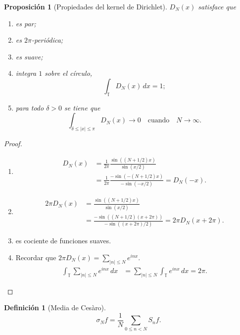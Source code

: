 \documentclass{article}
\newtheorem{Proposicion}{Proposición}
\theoremstyle{plain}
\theoremstyle{definition}
\newtheorem{Definicion}{Definición}
\newcommand{\T}{\mathbb{T}}
\newcommand{\abs}[1]{\lvert #1 \rvert}
\begin{document}
\begin{Proposicion}[Propiedades del kernel de Dirichlet]
  \(D_N(x)\) satisface que
  \begin{enumerate}
    \item es par;
    \item es \(2\pi\){-}periódica;
    \item es suave;
    \item integra \(1\) sobre el círculo,
    \begin{displaymath}
      \int_{\T} D_N(x) \, dx = 1;
    \end{displaymath}
    \item para todo \(\delta > 0\) se tiene que
    \begin{displaymath}
      \int_{\delta \le \abs{x} \le \pi} D_N(x) \to 0
      \quad \text{cuando}\quad N\to \infty.
    \end{displaymath}
  \end{enumerate}
\end{Proposicion}
\begin{proof}
\begin{enumerate}
  \item 
  \begin{align*}
    D_N(x) 
    &= \frac{1}{2\pi} \frac{\sin((N+1/2)x)}{\sin(x/2)} 
    \\&= \frac{1}{2\pi} \frac{-\sin(-(N+1/2)x)}{-\sin(-x/2)} 
    = D_N(-x).
  \end{align*}

  \item
  \begin{align*}
    2\pi D_N(x) 
    &= \frac{\sin((N+1/2)x)}{\sin(x/2)} 
    \\&= \frac{-\sin((N+1/2)(x+2\pi))}{-\sin((x+2\pi)/2)} 
    = 2\pi D_N(x+2\pi).
  \end{align*}

  \item es cociente de funciones suaves.

  \item Recordar que \(2\pi D_N(x) = \sum_{\abs{n}\le N} e^{inx}\). 
  \begin{align*}
    \int_{\T} \sum_{\abs{n} \le N} e^{inx}\, dx
    &=
    \sum_{\abs{n}\le N} \int_{\T} e^{inx} \, dx
    = 2\pi.
  \end{align*}
\end{enumerate}
\end{proof}

\begin{Definicion}[Media de Cesàro]
  \begin{displaymath}
    \sigma_N f 
    = 
    \frac{1}{N} \sum_{0\le n < N} S_{n} f.
  \end{displaymath}
\end{Definicion}
\end{document}
